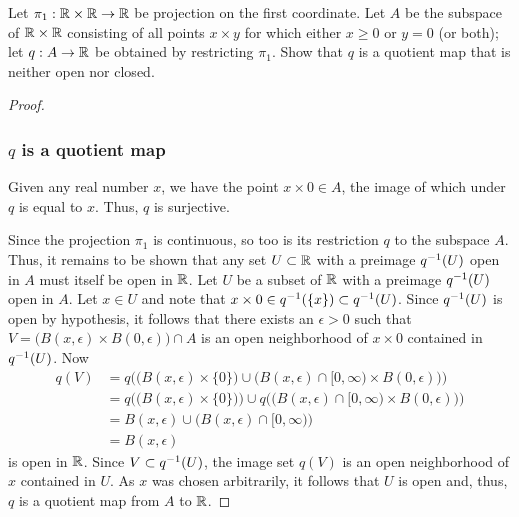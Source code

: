 %
\begin{exercise}[ID=2.22.3]
  Let $\pi_1: \mathbb{R} \times \mathbb{R} \rightarrow \mathbb{R}$ be projection on the first coordinate.
  Let $A$ be the subspace of $\mathbb{R} \times \mathbb{R}$ consisting of all points $x \times y$ for which either $x \geq 0$ or $y = 0$ (or both);
  let $q: A \rightarrow \mathbb{R}$ be obtained by restricting $\pi_1$.
  Show that $q$ is a quotient map that is neither open nor closed.
\end{exercise}
  \begin{solution}
    \begin{proof}~

      \subsubsection*{$q$ is a quotient map}
      Given any real number $x$, we have the point $x \times 0 \in A$, the image of which under $q$ is equal to $x$.
      Thus, $q$ is surjective.

      Since the projection $\pi_1$ is continuous, so too is its restriction $q$ to the subspace $A$.
      Thus, it remains to be shown that any set $U \subset \mathbb{R}$ with a preimage $q^{-1}(U)$ open in $A$ must itself be open in $\mathbb{R}$.
      Let $U$ be a subset of $\mathbb{R}$ with a preimage $q^{-1}(U)$ open in $A$.
      Let $x \in U$ and note that $x \times 0 \in q^{-1}(\{x\}) \subset q^{-1}(U)$.
      Since $q^{-1}(U)$ is open by hypothesis, it follows that there exists an $\epsilon > 0$ such that $V = \big(B(x, \epsilon) \times B(0, \epsilon)\big) \cap A$ is an open neighborhood of $x \times 0$ contained in $q^{-1}(U)$.
      Now
      \begin{align*}
        q(V)  &= q\Big(\big(B(x, \epsilon) \times \{0\}\big) \cup \big(B(x, \epsilon) \cap [0, \infty) \times B(0, \epsilon)\big)\Big) \\
              &= q\Big(\big(B(x, \epsilon) \times \{0\}\big)\Big) \cup q\Big(\big(B(x, \epsilon) \cap [0, \infty) \times B(0, \epsilon)\big)\Big) \\
              &= B(x, \epsilon) \cup \big(B(x, \epsilon) \cap [0, \infty)\big) \\
              &= B(x, \epsilon)
      \end{align*}
      is open in $\mathbb{R}$.
      Since $V \subset q^{-1}(U)$, the image set $q(V)$ is an open neighborhood of $x$ contained in $U$.
      As $x$ was chosen arbitrarily, it follows that $U$ is open and, thus, $q$ is a quotient map from $A$ to $\mathbb{R}$.
      \bigskip


\end{proof}
\end{solution}
